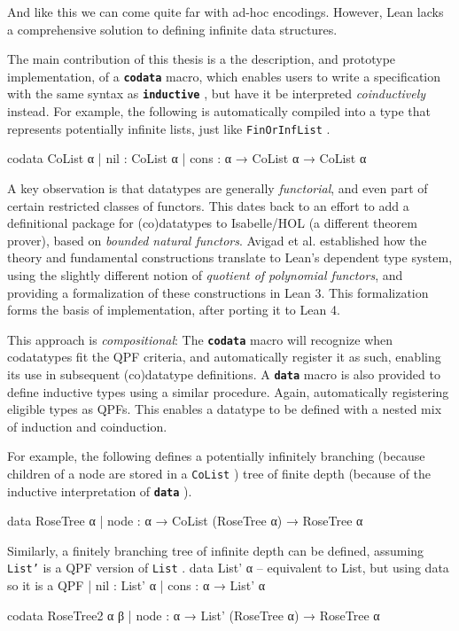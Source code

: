 \documentclass[titlepage]{report}
\newenvironment{leanhidden}{\expandafter\comment}{\expandafter\endcomment}
\newcommand\lean[1]{{%
\def\leanmode{1}%
\small \texttt{#1}%
\undef\leanmode%
}}
\newcommand\keyword[1]{{\color{keywordcolor} \textbf{\lean{#1}}}}
\newcommand\inductive{{\keyword{inductive}}}
\newcommand\data{\keyword{data}}
\newcommand\codata{\keyword{codata}}
\begin{document}
And like this we can come quite far with ad-hoc encodings. 
However, Lean lacks a comprehensive solution to defining infinite data structures.

The main contribution of this thesis is a the description, and prototype implementation, of a \codata{} macro, which enables users to write a specification with the same syntax as
\inductive, but have it be interpreted \emph{coinductively} instead.
For example, the following is automatically compiled into a type that represents potentially infinite lists, just like \lean{FinOrInfList}.

\begin{leancode}
    codata CoList α 
    | nil  : CoList α
    | cons : α → CoList α → CoList α
\end{leancode}

A key observation is that datatypes are generally \emph{functorial}, and even part of certain restricted classes of functors.
This dates back to an effort to add a definitional package for (co)datatypes to Isabelle/HOL (a different theorem prover), based on \emph{bounded natural functors}.\cite{biendarraDefiningCoDatatypes}\cite{traytelCategoryTheoryBased}
Avigad et al. established how the theory and fundamental constructions translate to Lean's dependent type system, using the slightly different notion of \emph{quotient of polynomial functors}, and providing a formalization of these constructions in Lean 3.\cite{avigadDataTypesQuotients2019a} This formalization forms the basis of implementation, after porting it to Lean 4.

This approach is \emph{compositional}:
The \codata{} macro will recognize when codatatypes fit the QPF criteria, and automatically register it as such, enabling its use in subsequent (co)datatype definitions.
A \data{} macro is also provided to define inductive types using a similar procedure. Again, automatically registering eligible types as QPFs. This enables a datatype to be defined with a nested mix of induction and coinduction.

For example, the following defines a potentially infinitely branching (because children of a node are stored in a \lean{CoList}) tree of finite depth (because of the inductive interpretation of \data).

\begin{leancode}
    data RoseTree α
    | node : α → CoList (RoseTree α) → RoseTree α
\end{leancode}

Similarly, a finitely branching tree of infinite depth can be defined, assuming \lean{List'} is a QPF version of \lean{List}.
\begin{leanhidden}
    data List' α -- equivalent to List, but using data so it is a QPF
    | nil  : List' α
    | cons : α → List' α
\end{leanhidden}
\begin{leancode}
    codata RoseTree2 α β
    | node : α → List' (RoseTree α) → RoseTree α
\end{leancode}
\end{document}
